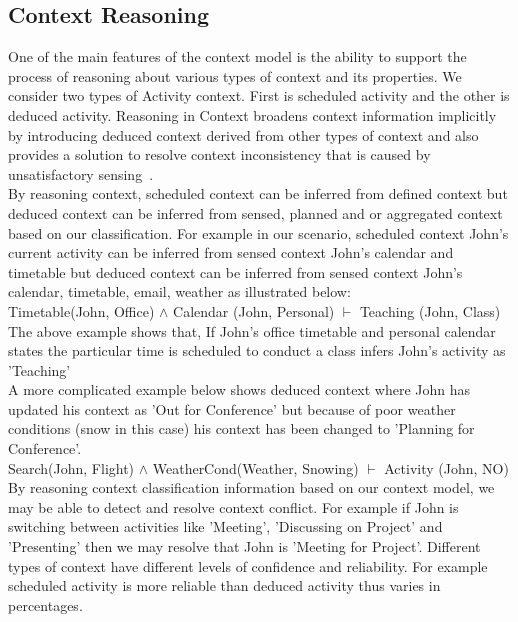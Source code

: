 \documentclass[copyright,creativecommons,noderivs,noncommercial]{eptcs}
\begin{document}
\subsection{Context Reasoning}
One of the main features of the context model is the ability to support the process of reasoning about various types of context and its properties. We consider two types of Activity context. First is scheduled activity and the other is deduced activity. Reasoning in Context broadens context information implicitly by introducing deduced context derived from other types of context and also provides a solution to resolve context inconsistency that is caused by unsatisfactory sensing~\cite{k12}.\\
By reasoning context, scheduled context can be inferred from defined context but deduced context can be inferred from sensed, planned and or aggregated context based on our classification. For example in our scenario, scheduled context John's current activity can be inferred from sensed context John's calendar and timetable but deduced context can be inferred from sensed context John's calendar, timetable, email, weather as illustrated below:\\

Timetable(John, Office) $\wedge$  Calendar (John, Personal) $\vdash$ Teaching (John, Class)\\

\noindent The above example shows that, If John's office timetable and personal calendar states the particular time is scheduled to conduct a class infers John's activity as 'Teaching'\\
A more complicated example below shows deduced context where John has updated his context as 'Out for Conference' but because of poor weather conditions (snow in this case) his context has been changed to 'Planning for Conference'.\\

Search(John, Flight) $\wedge$  WeatherCond(Weather, Snowing) $\vdash$ Activity (John, NO)\\

\noindent By reasoning context classification information based on our context model, we may be able to detect and resolve context conflict. For example if John is switching between activities like 'Meeting', 'Discussing on Project' and 'Presenting' then we may resolve that John is 'Meeting for Project'. Different types of context have different levels of confidence and reliability. For example scheduled activity is more reliable than deduced activity thus varies in percentages.
\end{document}
